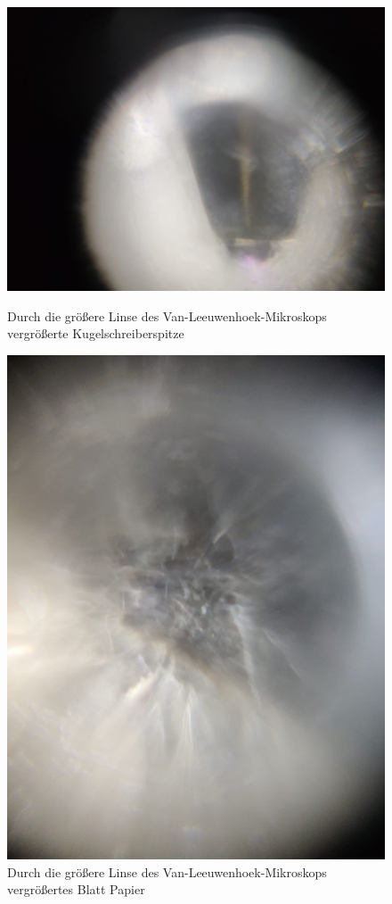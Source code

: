 \documentclass[english, ngerman]{scrartcl}
\begin{document}
\begin{figure}[H]
    \centering
    \begin{minipage}[b]{0.475\linewidth}
        \centering
        \includegraphics[width=\linewidth]{fig/Kulli.jpeg}
        \caption[Kugelschreiberspitze durch Van-Leeuwenhoek-Mikroskop]{Durch die größere Linse des Van-Leeuwenhoek-Mikroskops vergrößerte Kugelschreiberspitze}
        \label{fig:vanleeuwenhoek_kugelschreiber}
    \end{minipage}%
    \hspace*{\fill}
    \begin{minipage}[t]{0.475\linewidth}
        \centering
        \includegraphics[width=0.75\linewidth]{fig/papier_gross.jpeg}
        \caption[Blatt Papier durch Van-Leeuwenhoek-Mikroskop]{Durch die größere Linse des Van-Leeuwenhoek-Mikroskops vergrößertes Blatt Papier}
        \label{fig:vanleeuwenhoek_papier}
    \end{minipage}
\end{figure}
\end{document}

